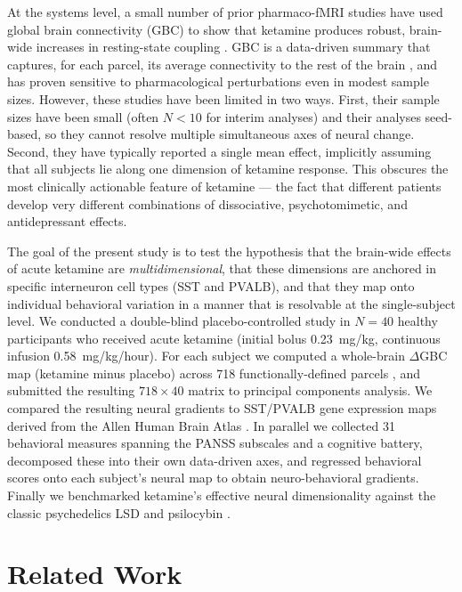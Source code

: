 At the systems level, a small number of prior pharmaco-fMRI studies have used
global brain connectivity (GBC) to show that ketamine produces robust,
brain-wide increases in resting-state coupling
\citep{driesen2013relationship,anticevic2014ncs,abdallah2018ketamine}. GBC is
a data-driven summary that captures, for each parcel, its average connectivity
to the rest of the brain \citep{cole2010globalbrain}, and has proven sensitive
to pharmacological perturbations even in modest sample sizes. However, these
studies have been limited in two ways. First, their sample sizes have been
small (often $N<10$ for interim analyses) and their analyses seed-based, so
they cannot resolve multiple simultaneous axes of neural change. Second,
they have typically reported a single mean effect, implicitly assuming that
all subjects lie along one dimension of ketamine response. This obscures the
most clinically actionable feature of ketamine --- the fact that different
patients develop very different combinations of dissociative, psychotomimetic,
and antidepressant effects.

The goal of the present study is to test the hypothesis that the brain-wide
effects of acute ketamine are \emph{multidimensional}, that these
dimensions are anchored in specific interneuron cell types (SST and PVALB),
and that they map onto individual behavioral variation in a manner that is
resolvable at the single-subject level. We conducted a double-blind
placebo-controlled study in $N=40$ healthy participants who received acute
ketamine (initial bolus 0.23~mg/kg, continuous infusion 0.58~mg/kg/hour). For
each subject we computed a whole-brain $\Delta$GBC map (ketamine minus
placebo) across 718 functionally-defined parcels
\citep{glasser2016multi,ji2019mapping}, and submitted the resulting $718 \times
40$ matrix to principal components analysis. We compared the resulting
neural gradients to SST/PVALB gene expression maps derived from the Allen
Human Brain Atlas \citep{hawrylycz2012anatomically}. In parallel we collected
31 behavioral measures spanning the PANSS subscales \citep{kay1987positive}
and a cognitive battery, decomposed these into their own data-driven axes,
and regressed behavioral scores onto each subject's neural map to obtain
neuro-behavioral gradients. Finally we benchmarked ketamine's effective
neural dimensionality against the classic psychedelics LSD and psilocybin
\citep{carhart2016neural,preller2020psilocybin,preller2018effective}.

\section{Related Work}

